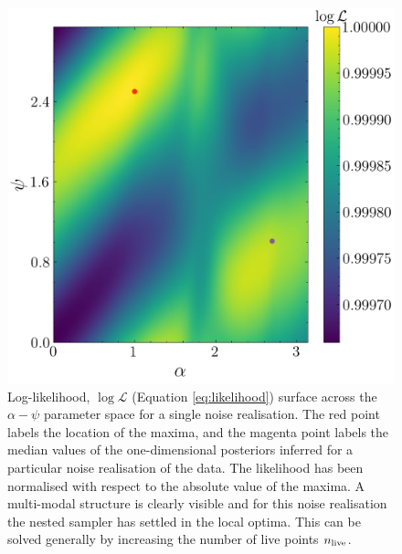 \documentclass[fleqn,usenatbib,useAMS]{mnras}
\begin{document}
\begin{figure}
	\centering
	\includegraphics[width=\columnwidth]{images/likelihood_surface_alpha_psi}
	\caption{Log-likelihood, $\log \mathcal{L}$ (Equation \ref{eq:likelihood}) surface across the $\alpha-\psi$ parameter space for a single noise realisation.  The red point labels the location of the maxima, and the magenta point labels the median values of the one-dimensional posteriors inferred for a particular noise realisation of the data. The likelihood has been normalised with respect to the absolute value of the maxima. A multi-modal structure is clearly visible and for this noise realisation the nested sampler has settled in the local optima. This can be solved generally by increasing the number of live points $n_{\rm live}$.}
	\label{fig:likelihood_surface_alpha_psi}
\end{figure}













\end{document}
